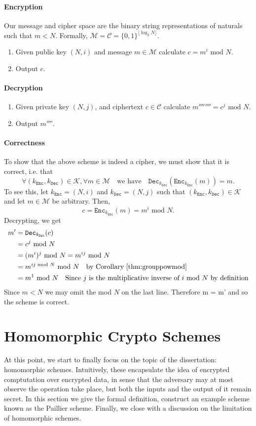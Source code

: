 \documentclass{article}
\theoremstyle{definition}
\newcommand{\Enc}{\texttt{Enc}}
\newcommand{\Dec}{\texttt{Dec}}
\newcommand{\M}{\mathcal{M}}
\renewcommand{\C}{\mathcal{C}}
\newcommand{\K}{\mathcal{K}}
\renewcommand{\mod}{\,\,\text{mod}\,\,}
\begin{document}
\paragraph{Encryption}
Our message and cipher space are the binary string representations of naturals such that $m
< N$. Formally, $\M = \C = \{0, 1\}^{\lfloor {\log_2N} \rfloor}$.
\begin{enumerate}
\item Given public key $(N, i)$ and message $m \in \M$ calculate $c = m^i \mod N$.
\item Output $c$.
\end{enumerate}
\paragraph{Decryption}
\begin{enumerate}
\item Given private key $(N, j)$, and ciphertext $c \in \C$ calculate $m'''''''' = c^j \mod
  N$.
\item Output $m''''$.
\end{enumerate}
\paragraph{Correctness} To show that the above scheme is indeed a cipher, we
must show that it is correct, i.e. that
\[
  \forall (k_\Enc, k_\Dec) \in \K, \forall m \in \M\quad\text{we have}\quad
  \Dec_{k_\Dec}(\Enc_{k_\Enc}(m)) = m.
\]
To see this, let $k_\Enc = (N, i)$ and $k_\Dec = (N, j)$ such that $(k_\Enc,
k_\Dec) \in \K$ and let $m \in \M$ be arbitrary. Then,
\[
  c = \Enc_{k_\Enc}(m) = m^i \mod N.
\]
Decrypting, we get
\begin{align*}
  m' &= \Dec_{k_\Dec}(c) \\
     &= c^j \mod N \\
     &= (m^i)^j \mod N = m^{ij} \mod N \\
     &= m^{ij \mod N} \mod N \quad \text{by Corollary \ref{thm:grouppowmod}} \\
     &= m^1 \mod N \quad \text{Since $j$ is the multiplicative inverse of $i$ mod $N$ by definition}
\end{align*}
Since $m < N$ we may omit the mod $N$ on the last line. Therefore m = m' and so the scheme is correct.
\section{Homomorphic Crypto Schemes}
\paragraph{}
At this point, we start to finally focus on the topic of the dissertation:
homomorphic schemes. Intuitively, these encapsulate the idea of encrypted
comptutation over encrypted data, in sense that the adversary may at most
observe the operation take place, but both the inputs and the output of it
remain secret. In this section we give the formal definition, construct an
example scheme known as the Paillier scheme. Finally, we close with a discussion
on the limitation of homomorphic schemes.
\end{document}
